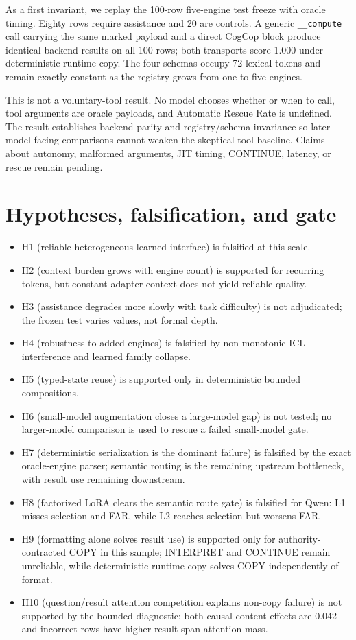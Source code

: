 \documentclass[10pt]{article}
\begin{document}
As a first invariant, we replay the 100-row five-engine test freeze with oracle
timing. Eighty rows require assistance and 20 are controls. A generic
\texttt{\_\_compute} call carrying the same marked payload and a direct CogCop
block produce identical backend results on all 100 rows; both transports score
1.000 under deterministic runtime-copy. The four schemas occupy 72 lexical
tokens and remain exactly constant as the registry grows from one to five
engines.

This is not a voluntary-tool result. No model chooses whether or when to call,
tool arguments are oracle payloads, and Automatic Rescue Rate is undefined.
The result establishes backend parity and registry/schema invariance so later
model-facing comparisons cannot weaken the skeptical tool baseline. Claims
about autonomy, malformed arguments, JIT timing, CONTINUE, latency, or rescue
remain pending.

\section{Hypotheses, falsification, and gate}

\begin{itemize}
\item H1 (reliable heterogeneous learned interface) is falsified at this scale.
\item H2 (context burden grows with engine count) is supported for recurring
      tokens, but constant adapter context does not yield reliable quality.
\item H3 (assistance degrades more slowly with task difficulty) is not
      adjudicated; the frozen test varies values, not formal depth.
\item H4 (robustness to added engines) is falsified by non-monotonic ICL
      interference and learned family collapse.
\item H5 (typed-state reuse) is supported only in deterministic bounded
      compositions.
\item H6 (small-model augmentation closes a large-model gap) is not tested; no
      larger-model comparison is used to rescue a failed small-model gate.
\item H7 (deterministic serialization is the dominant failure) is falsified by
      the exact oracle-engine parser; semantic routing is the remaining upstream
      bottleneck, with result use remaining downstream.
\item H8 (factorized LoRA clears the semantic route gate) is falsified for Qwen:
      L1 misses selection and FAR, while L2 reaches selection but worsens FAR.
\item H9 (formatting alone solves result use) is supported only for authority-
      contracted COPY in this sample; INTERPRET and CONTINUE remain unreliable,
      while deterministic runtime-copy solves COPY independently of format.
\item H10 (question/result attention competition explains non-copy failure) is
      not supported by the bounded diagnostic; both causal-content effects are
      0.042 and incorrect rows have higher result-span attention mass.
\end{itemize}
\end{document}
